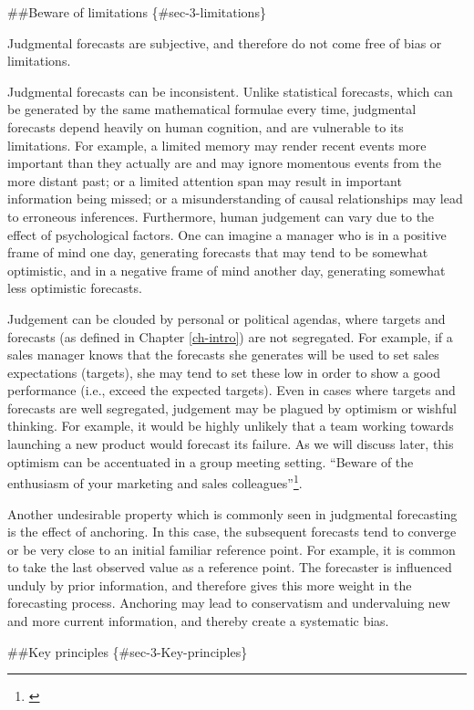 \documentclass[]{book}
\let\rmarkdownfootnote\footnote%
\def\footnote{\protect\rmarkdownfootnote}
\begin{document}
\#\#Beware of limitations \{\#sec-3-limitations\}

Judgmental forecasts are subjective, and therefore do not come free of bias or limitations.

Judgmental forecasts can be inconsistent. Unlike statistical forecasts, which can be generated by the same mathematical formulae every time, judgmental forecasts depend heavily on human cognition, and are vulnerable to its limitations. For example, a limited memory may render recent events more important than they actually are and may ignore momentous events from the more distant past; or a limited attention span may result in important information being missed; or a misunderstanding of causal relationships may lead to erroneous inferences. Furthermore, human judgement can vary due to the effect of psychological factors. One can imagine a manager who is in a positive frame of mind one day, generating forecasts that may tend to be somewhat optimistic, and in a negative frame of mind another day, generating somewhat less optimistic forecasts.

Judgement can be clouded by personal or political agendas, where targets and forecasts (as defined in Chapter \ref{ch-intro}) are not segregated. For example, if a sales manager knows that the forecasts she generates will be used to set sales expectations (targets), she may tend to set these low in order to show a good performance (i.e., exceed the expected targets). Even in cases where targets and forecasts are well segregated, judgement may be plagued by optimism or wishful thinking. For example, it would be highly unlikely that a team working towards launching a new product would forecast its failure. As we will discuss later, this optimism can be accentuated in a group meeting setting. ``Beware of the enthusiasm of your marketing and sales colleagues''\footnote{\citet{Fildes2007a}}.

Another undesirable property which is commonly seen in judgmental forecasting is the effect of anchoring. In this case, the subsequent forecasts tend to converge or be very close to an initial familiar reference point. For example, it is common to take the last observed value as a reference point. The forecaster is influenced unduly by prior information, and therefore gives this more weight in the forecasting process. Anchoring may lead to conservatism and undervaluing new and more current information, and thereby create a systematic bias.

\#\#Key principles \{\#sec-3-Key-principles\}
\end{document}
